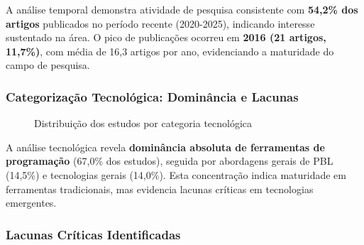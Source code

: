 \documentclass[english, spanish, brazilian]{RBIEarticle} %
\begin{document}
A análise temporal demonstra atividade de pesquisa consistente com \textbf{54,2\% dos artigos} publicados no período recente (2020-2025), indicando interesse sustentado na área. O pico de publicações ocorreu em \textbf{2016 (21 artigos, 11,7\%)}, com média de 16,3 artigos por ano, evidenciando a maturidade do campo de pesquisa.

\subsubsection{Categorização Tecnológica: Dominância e Lacunas}

\begin{figure}[htbp]
\centering
{}
\caption{Distribuição dos estudos por categoria tecnológica}
\label{fig:tecnologia}
\end{figure}

A análise tecnológica revela \textbf{dominância absoluta de ferramentas de programação} (67,0\% dos estudos), seguida por abordagens gerais de PBL (14,5\%) e tecnologias gerais (14,0\%). Esta concentração indica maturidade em ferramentas tradicionais, mas evidencia lacunas críticas em tecnologias emergentes.

\subsubsection{Lacunas Críticas Identificadas}
\end{document}
